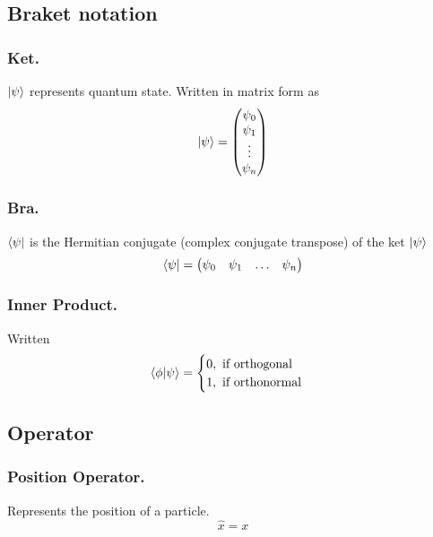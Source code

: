 \documentclass[../../../main.tex]{subfiles}
\begin{document}
\subsection*{Braket notation}
\subsubsection*{Ket.} $\ket{\psi}$ represents quantum state. Written in matrix form as 
\begin{equation*}
    \ket{\psi}=\begin{pmatrix}
        \psi_0\\
        \psi_1\\
        \vdots\\
        \psi_n
    \end{pmatrix}
\end{equation*}
\subsubsection*{Bra.} $\bra{\psi}$ is the Hermitian conjugate (complex conjugate transpose) of the ket $\ket{\psi}$
\begin{equation*}
    \bra{\psi}=\begin{pmatrix}
        \psi_0&
        \psi_1&
        \ldots&
        \psi_n
    \end{pmatrix}
\end{equation*}

\subsubsection*{Inner Product.} Written
\begin{equation*}
    \braket{\phi|\psi}=\begin{cases}
        0, \text{ if orthogonal}\\
        1, \text{ if orthonormal}
    \end{cases}
\end{equation*}

\subsection*{Operator}
\subsubsection*{Position Operator.} Represents the position of a particle.
\begin{equation*}
    \hat{x}=x
\end{equation*}
\end{document}

